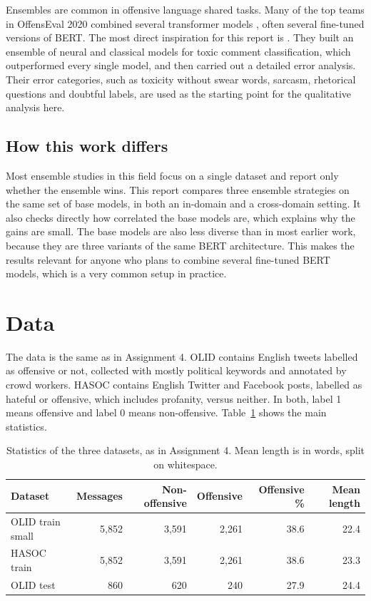 \documentclass[11pt,a4paper]{article}
\begin{document}
Ensembles are common in offensive language shared tasks. Many of the top teams in OffensEval 2020 combined several transformer models \citep{zampieri2020semeval}, often several fine-tuned versions of BERT. The most direct inspiration for this report is \citet{vanaken2018challenges}. They built an ensemble of neural and classical models for toxic comment classification, which outperformed every single model, and then carried out a detailed error analysis. Their error categories, such as toxicity without swear words, sarcasm, rhetorical questions and doubtful labels, are used as the starting point for the qualitative analysis here.

\subsection{How this work differs}

Most ensemble studies in this field focus on a single dataset and report only whether the ensemble wins. This report compares three ensemble strategies on the same set of base models, in both an in-domain and a cross-domain setting. It also checks directly how correlated the base models are, which explains why the gains are small. The base models are also less diverse than in most earlier work, because they are three variants of the same BERT architecture. This makes the results relevant for anyone who plans to combine several fine-tuned BERT models, which is a very common setup in practice.

\section{Data}
\label{sec:data}

The data is the same as in Assignment 4. OLID \citep{zampieri2019olid} contains English tweets labelled as offensive or not, collected with mostly political keywords and annotated by crowd workers. HASOC \citep{mandl2019hasoc} contains English Twitter and Facebook posts, labelled as hateful or offensive, which includes profanity, versus neither. In both, label 1 means offensive and label 0 means non-offensive. Table~\ref{tab:data} shows the main statistics.

\begin{table}[H]
\centering
\caption{Statistics of the three datasets, as in Assignment 4. Mean length is in words, split on whitespace.}
\label{tab:data}
\begin{tabular}{lrrrrr}
\toprule
Dataset & Messages & Non-offensive & Offensive & Offensive \% & Mean length \\
\midrule
OLID train small & 5,852 & 3,591 & 2,261 & 38.6 & 22.4 \\
HASOC train      & 5,852 & 3,591 & 2,261 & 38.6 & 23.3 \\
OLID test        & 860   & 620   & 240   & 27.9 & 24.4 \\
\bottomrule
\end{tabular}
\end{table}
\end{document}
